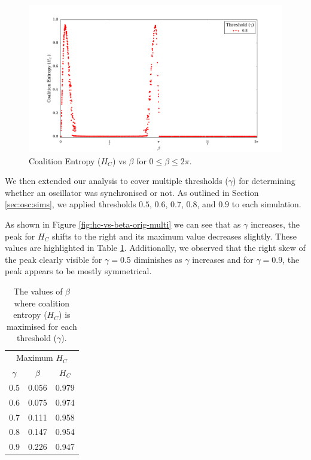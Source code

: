 \documentclass[a4paper,11pt]{article}
\begin{document}
\begin{figure}[H]
\begin{center}
\includegraphics[scale = 0.35]{figures/hc_vs_beta_ext}
\caption{
	Coalition Entropy ($H_C$) vs $\beta$ for $0 \leq \beta \leq 2\pi$.
	\label{fig:hc-vs-beta-ext}
}
\end{center}
\end{figure}

We then extended our analysis to cover multiple thresholds ($\gamma$) for determining whether an oscillator was synchronised or not. As outlined in Section \ref{sec:osc:sims}, we applied thresholds $0.5$, $0.6$, $0.7$, $0.8$, and $0.9$ to each simulation.

As shown in Figure \ref{fig:hc-vs-beta-orig-multi} we can see that as $\gamma$ increases, the peak for $H_C$ shifts to the right and its maximum value decreases slightly. These values are highlighted in Table \ref{tab:max-hc-beta}. Additionally, we observed that the right skew of the peak clearly visible for $\gamma = 0.5$ diminishes as $\gamma$ increases and for $\gamma = 0.9$, the peak appears to be mostly symmetrical.

\begin{table}[H]
\centering
\begin{tabular}{ c | c c }
\multicolumn{3}{c}{Maximum $H_C$} \\ [2mm]
$\gamma$ & $\beta$ & $H_C$\\
\hline
0.5 & 0.056 & 0.979 \\
0.6 & 0.075 & 0.974 \\
0.7 & 0.111 & 0.958 \\
0.8 & 0.147 & 0.954 \\
0.9 & 0.226 & 0.947 \\
\end{tabular}
\caption{
	The values of $\beta$ where coalition entropy ($H_C$) is maximised for each threshold ($\gamma$).
	\label{tab:max-hc-beta}
}
\end{table}
\end{document}
